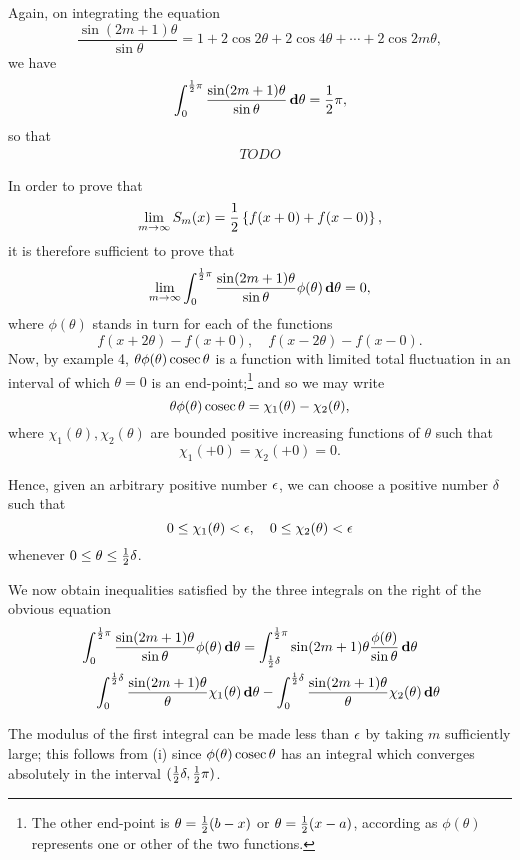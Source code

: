 Again, on integrating the equation
$$
\frac{\sin (2m+1)\theta}{\sin \theta}
=
1
+ 2 \cos 2\theta
+ 2 \cos 4\theta
+ \cdots
+ 2 \cos 2m\theta,
$$
we have
$$
\int_{0}^{\frac{1}{2}\pi}
\frac{\sin (2m+1)\theta}{\sin \theta}
\, \mathbf{d} \theta
=
\frac{1}{2}\pi,
$$
so that
\begin{align*}
  TODO
\end{align*}

In order to prove that
$$
\lim_{m \rightarrow \infty}
S_{m}(x)
=
\frac{1}{2} \left\{ 
  f(x+0) + f(x-0)
 \right\},
$$
it is therefore sufficient to prove that
$$
\lim_{m \rightarrow \infty}
\int_{0}^{\frac{1}{2}\pi}
\frac{\sin (2m+1)\theta}{\sin \theta}
\phi(\theta) \, \mathbf{d} \theta
=
0,
$$
where $\phi(\theta)$ stands in turn for each of the functions
$$
f(x+2\theta) - f(x+0),
\quad
f(x-2\theta) - f(x-0).
$$
Now, by  example 4, %
$\theta \phi(\theta) \operatorname{cosec} \theta$ is a function with limited
total fluctuation in an interval of which $\theta=0$ is an
end-point;\footnote{The other end-point is $\theta = \frac{1}{2} (b-x)$
  or $\theta = \frac{1}{2} (x-a)$, according as $\phi(\theta)$
  represents one or other of the two functions.} and so
we may write
$$
\theta
\phi (\theta)
\operatorname{cosec} \theta
=
\chi_{1}(\theta)
-
\chi_{2}(\theta),
$$
where $\chi_{1}(\theta), \chi_{2}(\theta)$ are bounded positive
increasing functions of $\theta$ such that
$$
\chi_{1}(+0) = \chi_{2}(+0) = 0.
$$

Hence, given an arbitrary positive number $\epsilon$, we can choose a positive
number $\delta$ such that
$$
0 \leq \chi_{1}(\theta) < \epsilon,
\quad
0 \leq \chi_{2}(\theta) < \epsilon
$$
whenever $0 \leq \theta \leq \frac{1}{2} \delta$.

We now obtain inequalities satisfied by the three integrals on the
right of the obvious equation
\begin{align*}
  &
 \int_{0}^{\frac{1}{2}\pi}
 \frac{\sin (2m+1)\theta}{\sin \theta}
 \phi(\theta) \, \mathbf{d} \theta
 =
 \int_{\frac{1}{2} \delta}^{\frac{1}{2} \pi}
 \sin (2m+1)\theta
 \frac{\phi(\theta)}{\sin \theta}
 \, \mathbf{d} \theta
 \\
 &
 \quad
 \int_{0}^{\frac{1}{2} \delta}
 \frac{\sin (2m+1)\theta}{\theta}
 \chi_{1}(\theta) \, \mathbf{d} \theta
 -
 \int_{0}^{\frac{1}{2} \delta}
 \frac{\sin (2m+1)\theta}{\theta}
 \chi_{2}(\theta) \, \mathbf{d} \theta
\end{align*}
%
%

The modulus of the first integral can be made less than $\epsilon$ by taking $m$
sufficiently large; this follows from
 (i) %
since $\phi(\theta) \operatorname{cosec} \theta$
has an integral which converges absolutely in the interval
$(\frac{1}{2} \delta, \frac{1}{2} \pi)$.

